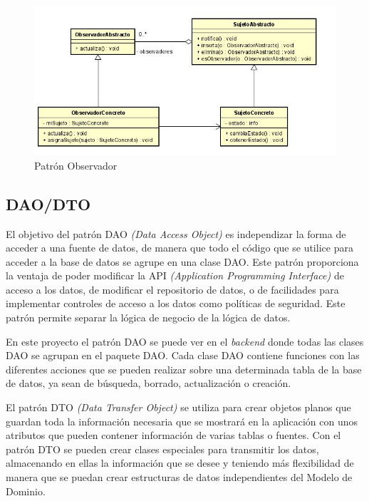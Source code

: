  \begin{figure}[H]
     \centering
     \includegraphics[scale=0.6]{img/observador-nuevo.jpg}
     \caption{Patrón Observador}
     \label{fig:patron-observador}
 \end{figure}
 
 \subsection{DAO/DTO}
 El objetivo del patrón DAO \textit{(Data Access Object)} \cite{DAO}  es independizar la forma de acceder a una fuente de datos, de manera que todo el código que se utilice para acceder a la base de datos se agrupe en una clase DAO. Este patrón proporciona la ventaja de poder modificar la API \textit{ (Application Programming Interface)} de acceso a los datos, de modificar el repositorio de datos, o de facilidades para implementar controles de acceso a los datos como políticas de seguridad. Este patrón permite separar la lógica de negocio de la lógica de datos. 
 
 En este proyecto el patrón DAO se puede ver en el \textit{backend} donde todas las clases DAO se agrupan en el paquete DAO. Cada clase DAO contiene funciones con las diferentes acciones que se pueden realizar sobre una determinada tabla de la base de datos, ya sean de búsqueda, borrado, actualización o creación. 
 
 El patrón DTO \textit{(Data Transfer Object)} \cite{DTO} se utiliza para crear objetos planos que guardan toda la información necesaria que se mostrará en la aplicación con unos atributos que pueden contener información de varias tablas o fuentes. Con el patrón DTO se pueden crear clases especiales para transmitir los datos, almacenando en ellas la información que se desee y teniendo más flexibilidad de manera que se puedan crear estructuras de datos independientes del Modelo de Dominio.
 
